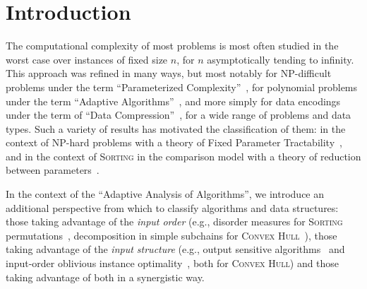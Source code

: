 \section{Introduction}
\label{sec:intro}


The computational complexity of most problems is most often studied in
the worst case over instances of fixed size $n$, for $n$
asymptotically tending to infinity. This approach was refined in many
ways, but most notably for NP-difficult problems under the term
``Parameterized
Complexity''~\cite{2006-BOOK-ParameterizedComplexityTheory-FlumGrohe},
for polynomial problems under the term ``Adaptive
Algorithms''~\cite{1992-ACMCS-ASurveyOfAdaptiveSortingAlgorithms-EstivillCastroWood,1992-ACJ-AnOverviewOfAdaptiveSorting-MoffatPetersson},
and more simply for data encodings under the term of ``Data
Compression''~\cite{2013-TCS-OnCompressingPermutationsAndAdaptiveSorting-BarbayNavarro},
for a wide range of problems and data types.  Such a variety of
results has motivated the classification of them: in the context of
NP-hard problems with a theory of Fixed Parameter
Tractability~\cite{2006-BOOK-ParameterizedComplexityTheory-FlumGrohe},
and in the context of \textsc{Sorting} in the comparison model with a
theory of reduction between
parameters~\cite{1995-DAM-AFrameworkForAdaptiveSorting-PeterssonMoffat}.


In the context of the ``Adaptive Analysis of Algorithms'', we
introduce an additional perspective from which to classify algorithms
and data structures: those taking advantage of the \emph{input order}
(e.g., disorder measures for \textsc{Sorting}
permutations~\cite{1992-ACJ-AnOverviewOfAdaptiveSorting-MoffatPetersson,1992-ACMCS-ASurveyOfAdaptiveSortingAlgorithms-EstivillCastroWood},
decomposition in simple subchains for \textsc{Convex
  Hull}~\cite{2002-SWAT-AdaptiveAlgorithmsForConstructingConvexHullsAndTriangulationsOfPolygonalChains-LevcopoulosLingasMitchell}),
those taking advantage of the \emph{input structure} (e.g., output
sensitive
algorithms~\cite{1986-JCom-TheUltimatePlanarConvexHullAlgorithm-KirkpatrickSeidel}
and input-order oblivious instance
optimality~\cite{2009-FOCS-InstanceOptimalGeometricAlgorithms-AfshaniBarbayChan},
both for \textsc{Convex Hull}) and those taking advantage of both in a
synergistic way.

